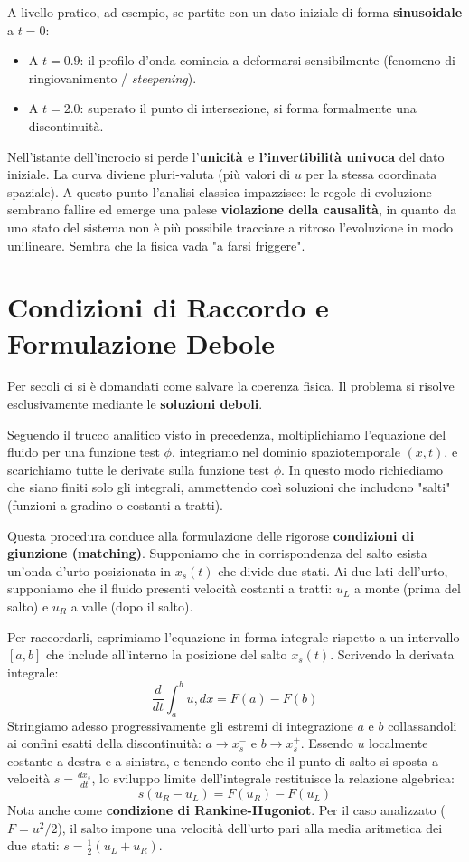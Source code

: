 A livello pratico, ad esempio, se partite con un dato iniziale di forma \textbf{sinusoidale} a $t = 0$:
\begin{itemize}
\item A $t = 0.9$: il profilo d'onda comincia a deformarsi sensibilmente (fenomeno di ringiovanimento / \textit{steepening}).
\item A $t = 2.0$: superato il punto di intersezione, si forma formalmente una discontinuità.
\end{itemize}
Nell'istante dell'incrocio si perde l'\textbf{unicità e l'invertibilità univoca} del dato iniziale. La curva diviene pluri-valuta (più valori di $u$ per la stessa coordinata spaziale).
A questo punto l'analisi classica impazzisce: le regole di evoluzione sembrano fallire ed emerge una palese \textbf{violazione della causalità}, in quanto da uno stato del sistema non è più possibile tracciare a ritroso l'evoluzione in modo unilineare. Sembra che la fisica vada "a farsi friggere".

\section{Condizioni di Raccordo e Formulazione Debole}

Per secoli ci si è domandati come salvare la coerenza fisica. Il problema si risolve esclusivamente mediante le \textbf{soluzioni deboli}.

Seguendo il trucco analitico visto in precedenza, moltiplichiamo l'equazione del fluido per una funzione test $\phi$, integriamo nel dominio spaziotemporale $(x,t)$, e scarichiamo tutte le derivate sulla funzione test $\phi$. In questo modo richiediamo che siano finiti solo gli integrali, ammettendo così soluzioni che includono "salti" (funzioni a gradino o costanti a tratti).

Questa procedura conduce alla formulazione delle rigorose \textbf{condizioni di giunzione (matching)}.
Supponiamo che in corrispondenza del salto esista un'onda d'urto posizionata in $x_s(t)$ che divide due stati. Ai due lati dell'urto, supponiamo che il fluido presenti velocità costanti a tratti: $u_L$ a monte (prima del salto) e $u_R$ a valle (dopo il salto).

Per raccordarli, esprimiamo l'equazione in forma integrale rispetto a un intervallo $[a, b]$ che include all'interno la posizione del salto $x_s(t)$. Scrivendo la derivata integrale:
\begin{equation}
\frac{d}{dt} \int_a^b u , dx = F(a) - F(b)
\end{equation}
Stringiamo adesso progressivamente gli estremi di integrazione $a$ e $b$ collassandoli ai confini esatti della discontinuità: $a \to x_s^-$ e $b \to x_s^+$. Essendo $u$ localmente costante a destra e a sinistra, e tenendo conto che il punto di salto si sposta a velocità $s = \frac{dx_s}{dt}$, lo sviluppo limite dell'integrale restituisce la relazione algebrica:
\begin{equation}
s(u_R - u_L) = F(u_R) - F(u_L)
\end{equation}
Nota anche come \textbf{condizione di Rankine-Hugoniot}. Per il caso analizzato ($F=u^2/2$), il salto impone una velocità dell'urto pari alla media aritmetica dei due stati: $s = \frac{1}{2}(u_L + u_R)$.


